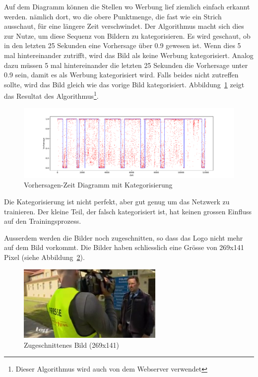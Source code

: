 \documentclass[12pt,a4paper]{report}
\begin{document}
Auf dem Diagramm können die Stellen wo Werbung lief ziemlich einfach erkannt werden.
nämlich dort, wo die obere Punktmenge, die fast wie ein Strich ausschaut, für eine längere Zeit verschwindet.
Der Algorithmus macht sich dies zur Nutze, um diese Sequenz von Bildern zu kategorisieren.
Es wird geschaut, ob in den letzten 25 Sekunden eine Vorhersage über 0.9 gewesen ist.
Wenn dies 5 mal hintereinander zutrifft, wird das Bild als keine Werbung kategorisiert.
Analog dazu müssen 5 mal hintereinander die letzten 25 Sekunden die Vorhersage unter 0.9 sein,
damit es als Werbung kategorisiert wird.
Falls beides nicht zutreffen sollte, wird das Bild gleich wie das vorige Bild kategorisiert.
Abbildung~\ref{fig:points_line} zeigt das Resultat des Algorithmus\footnote{Dieser Algorithmus wird auch von dem Webserver verwendet}.
\begin{figure}[h]%
    \centering
    \includegraphics[width=1.0\textwidth]{assets/python/points_blue_line.pdf}%
    \caption{Vorhersagen-Zeit Diagramm mit Kategorisierung}%
    \label{fig:points_line}%
\end{figure}
Die Kategorisierung ist nicht perfekt, aber gut genug um das Netzwerk zu trainieren.
Der kleine Teil, der falsch kategorisiert ist, hat keinen grossen Einfluss auf den Trainingsprozess.

Ausserdem werden die Bilder noch zugeschnitten, so dass das Logo nicht mehr auf dem Bild vorkommt.
Die Bilder haben schliesslich eine Grösse von 269x141 Pixel (siehe Abbildung~\ref{fig:cropped_img}).
\begin{figure}[h]%
    \centering
    \includegraphics[width=7cm]{assets/images/cropped.png}%
    \caption{Zugeschnittenes Bild (269x141)}%
    \label{fig:cropped_img}%
\end{figure}
\end{document}
